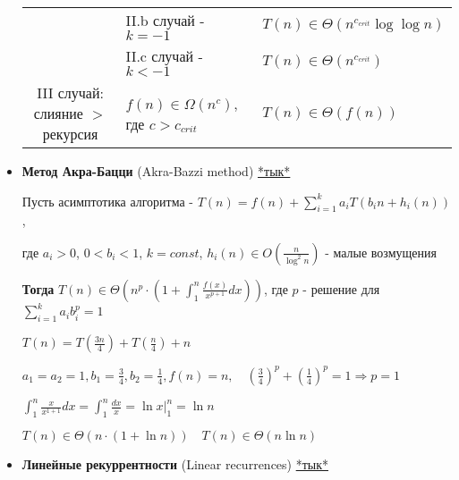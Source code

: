 \documentclass[12pt]{article}
\begin{document}
\begin{itemize}
\begin{tabular}{cll}
            & II.b случай - $k = -1$ & $T(n) \in \Theta(n^{c_{crit}} \log \log n)$ \\

            & II.c случай - $k < -1$ & $T(n) \in \Theta(n^{c_{crit}})$ \\

            \hline

            III случай: слияние $>$ рекурсия & $f(n) \in \Omega(n^c)$, где $c > c_{crit}$ & $T(n) \in \Theta(f(n))$\\

            \hline

        \end{tabular}

        \vspace{4mm}

        \item \textbf{Метод Акра-Бацци} (Akra-Bazzi method)
        \hfill\href{https://en.wikipedia.org/wiki/Akra%E2%80%93Bazzi_method}{*тык*}


        Пусть асимптотика алгоритма - $T(n) = f(n) + \sum_{i = 1}^k a_i T(b_i n + h_i(n))$,

        где $a_i > 0$, $0 < b_i < 1$, $k = const$, $h_i(n) \in O\left(\frac{n}{\log^2 n}\right)$ - малые возмущения

        \textbf{Тогда} $T(n) \in \Theta\left(n^p \cdot \left(1 + \int_1^n \frac{f(x)}{x^{p + 1}} dx\right)\right)$, где $p$ - решение для $\sum_{i = 1}^k a_i b_i^p = 1$

        \Exs $T(n) = T\left(\frac{3n}{4}\right) + T\left(\frac{n}{4}\right) + n$

        $a_1 = a_2 = 1, b_1 = \frac{3}{4}, b_2 = \frac{1}{4}, f(n) = n, \quad \left(\frac{3}{4}\right)^p + \left(\frac{1}{4}\right)^p = 1 \Longrightarrow p = 1$

        $\int_1^n \frac{x}{x^{1 + 1}}dx = \int_1^n \frac{dx}{x} = \ln x \Big|_1^n = \ln n$

        $T(n) \in \Theta(n \cdot (1 + \ln n)) \quad T(n) \in \Theta(n \ln n)$

        \vspace{3mm}

        \item \textbf{Линейные рекуррентности} (Linear recurrences)
        \hfill\href{https://ru.wikipedia.org/wiki/%D0%A0%D0%B5%D0%BA%D1%83%D1%80%D1%80%D0%B5%D0%BD%D1%82%D0%BD%D0%B0%D1%8F_%D1%84%D0%BE%D1%80%D0%BC%D1%83%D0%BB%D0%B0#%D0%9B%D0%B8%D0%BD%D0%B5%D0%B9%D0%BD%D1%8B%D0%B5_%D1%80%D0%B5%D0%BA%D1%83%D1%80%D1%80%D0%B5%D0%BD%D1%82%D0%BD%D1%8B%D0%B5_%D1%83%D1%80%D0%B0%D0%B2%D0%BD%D0%B5%D0%BD%D0%B8%D1%8F}{*тык*}


\end{itemize}
\end{document}
